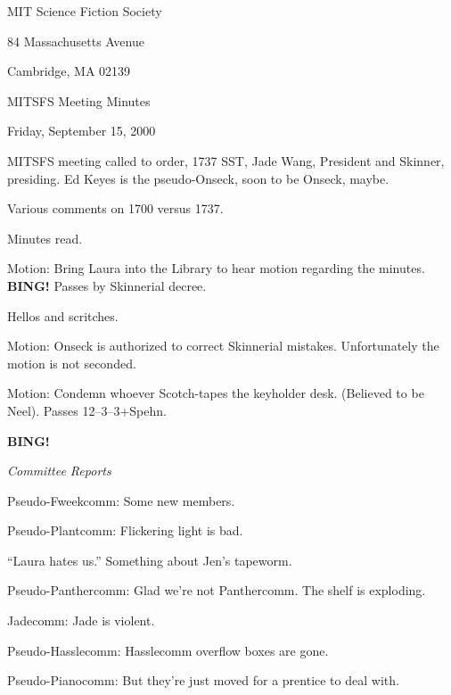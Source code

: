 \documentclass[12pt]{article}
\newcommand{\bing}{{\bf BING!} }
\newcommand{\goto}[1]{\bing \vskip 12pt \centerline{{\em{#1}}}}
\begin{document}
\begin{center}

MIT Science Fiction Society 

84 Massachusetts Avenue

Cambridge, MA 02139

\vspace{12pt}

MITSFS Meeting Minutes 

Friday, September 15, 2000

\end{center}
 
\vspace{18pt}

\setlength{\parskip}{6pt}

\noindent
MITSFS meeting called to order, 1737 SST, Jade Wang, President and
Skinner, presiding.  Ed Keyes is the pseudo-Onseck, soon to be Onseck,
maybe.



Various comments on 1700 versus 1737.

Minutes read.

Motion: Bring Laura into the Library to hear motion regarding the
minutes.  \bing  Passes by Skinnerial decree.

Hellos and scritches.

Motion: Onseck is authorized to correct Skinnerial mistakes.  Unfortunately
the motion is not seconded.

Motion: Condemn whoever Scotch-tapes the keyholder desk.  (Believed to be
Neel).  Passes 12--3--3+Spehn.

\goto{Committee Reports}

Pseudo-Fweekcomm: Some new members.

Pseudo-Plantcomm: Flickering light is bad.

``Laura hates us.''  Something about Jen's tapeworm.

Pseudo-Panthercomm: Glad we're not Panthercomm.  The shelf is exploding.

Jadecomm: Jade is violent.

Pseudo-Hasslecomm: Hasslecomm overflow boxes are gone.

Pseudo-Pianocomm: But they're just moved for a prentice to deal with.
\end{document}
